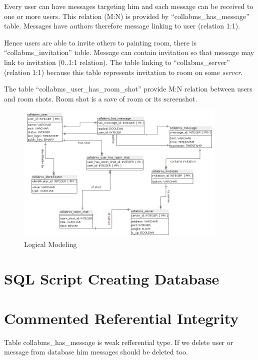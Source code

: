 \documentclass[12pt,oneside,a4paper]{article}
\begin{document}
Every user can have messages targeting him and each message can be received to one or more users. This relation (M:N) is provided by ``collabms\_{}has\_{}message'' table. Messages have authors therefore message linking to user (relation 1:1).

Hence users are able to invite others to painting room, there is ``collabms\_{}invitation'' table. Message can contain invitation so that message may link to invitation (0..1:1 relation). The table linking to ``collabms\_{}server'' (relation 1:1) because this table represents invitation to room on some  \emph{server}.

The table ``collabms\_{}user\_{}has\_{}room\_{}shot'' provide M:N relation between users and room shots. Room shot is a save of room or its screenshot.

\begin{figure}[h]
	\centering
	\includegraphics[width=0.9\textwidth]{figures/logical_model.png}
	\caption{Logical Modeling}
	\label{fig.logical_model}
\end{figure}

\section{SQL Script Creating Database}


\newpage

\section{Commented Referential Integrity}

\noindent
Table collabms\_has\_message is weak refferential type. If we delete user or message from database him messages should be deleted too.
\end{document}
